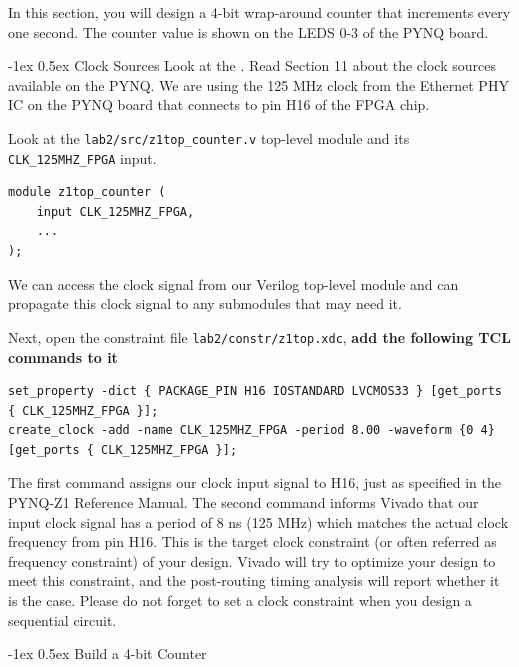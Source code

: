 \documentclass[11pt]{article}
\makeatletter
\renewcommand{\subsection}
{\@startsection {subsection}{1}{0pt}
 {-1ex}
 {0.5ex}
 {\bfseries\normalsize}}
\makeatother
\begin{document}
In this section, you will design a 4-bit wrap-around counter that increments every one second. The counter value is shown on the LEDS 0-3 of the PYNQ board.

\subsection{Clock Sources}
Look at the \href{https://reference.digilentinc.com/reference/programmable-logic/pynq-z1/reference-manual}{\color{blue}{PYNQ Reference Manual}}.
Read Section 11 about the clock sources available on the PYNQ.
We are using the 125 MHz clock from the Ethernet PHY IC on the PYNQ board that connects to pin H16 of the FPGA chip.

Look at the \verb|lab2/src/z1top_counter.v| top-level module and its \verb|CLK_125MHZ_FPGA| input.
\begin{verbatim}
module z1top_counter (
    input CLK_125MHZ_FPGA,
    ...
);
\end{verbatim}

We can access the clock signal from our Verilog top-level module and can propagate this clock signal to any submodules that may need it.

Next, open the constraint file \verb|lab2/constr/z1top.xdc|, \textbf{add the following TCL commands to it}

\begin{verbatim}
set_property -dict { PACKAGE_PIN H16 IOSTANDARD LVCMOS33 } [get_ports { CLK_125MHZ_FPGA }];
create_clock -add -name CLK_125MHZ_FPGA -period 8.00 -waveform {0 4} [get_ports { CLK_125MHZ_FPGA }];
\end{verbatim}

The first command assigns our clock input signal to H16, just as specified in the PYNQ-Z1 Reference Manual. The second command informs Vivado that our input clock signal has a period of 8 ns (125 MHz) which matches the actual clock frequency from pin H16. This is the target clock constraint (or often referred as frequency constraint) of your design. Vivado will try to optimize your design to meet this constraint, and the post-routing timing analysis will report whether it is the case. Please do not forget to set a clock constraint when you design a sequential circuit.

\subsection{Build a 4-bit Counter}
\end{document}
